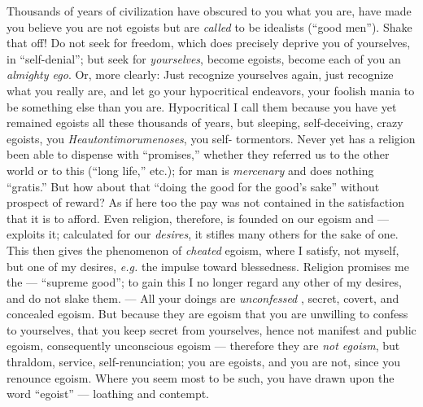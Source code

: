 Thousands of years of civilization have obscured to you what you are, have 
made you believe you are not egoists but are \textit{called} to be idealists 
(``good men''). Shake that off! Do not seek for freedom, which does 
precisely deprive you of yourselves, in ``self-denial''; but seek for 
\textit{yourselves}, become egoists, become each of you an \textit{almighty 
ego}. Or, more clearly: Just recognize yourselves again, just recognize what 
you really are, and let go your hypocritical endeavors, your foolish mania to 
be something else than you are. Hypocritical I call them because you have yet 
remained egoists all these thousands of years, but sleeping, self-deceiving, 
crazy egoists, you \textit{Heautontimorumenoses}, you self- tormentors. Never 
yet has a religion been able to dispense with ``promises,'' whether they 
referred us to the other world or to this (``long life,'' etc.); for man is 
\textit{mercenary} and does nothing ``gratis.'' But how about that ``doing 
the good for the good's sake'' without prospect of reward? As if here too the 
pay was not contained in the satisfaction that it is to afford. Even religion, 
therefore, is founded on our egoism and --- exploits it; calculated for our 
\textit{desires}, it stifles many others for the sake of one. This then gives 
the phenomenon of \textit{cheated} egoism, where I satisfy, not myself, but 
one of my desires, \textit{e.g.} the impulse toward blessedness. Religion 
promises me the --- ``supreme good''; to gain this I no longer regard any 
other of my desires, and do not slake them. --- All your doings are 
\textit{unconfessed} , secret, covert, and concealed egoism. But because they 
are egoism that you are unwilling to confess to yourselves, that you keep 
secret from yourselves, hence not manifest and public egoism, consequently 
unconscious egoism --- therefore they are \textit{not egoism}, but thraldom, 
service, self-renunciation; you are egoists, and you are not, since you 
renounce egoism. Where you seem most to be such, you have drawn upon the word 
``egoist'' --- loathing and contempt.

